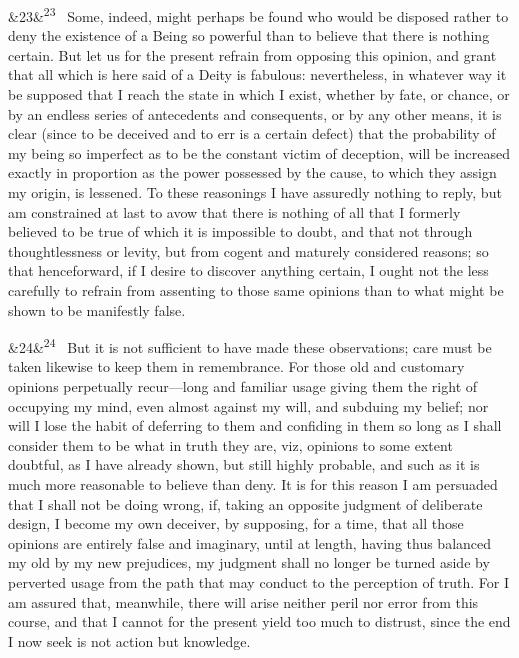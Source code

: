 \documentclass[12pt]{article}
\newcommand{\para}[1][]{\par\noindent\ifx&#1&\else\textsuperscript{\footnotesize #1}~\fi}
\begin{document}
\para[23] Some, indeed, might perhaps be found who would be disposed rather to deny the existence of a Being so powerful than to believe that there is nothing certain. But let us for the present refrain from opposing this opinion, and grant that all which is here said of a Deity is fabulous: nevertheless, in whatever way it be supposed that I reach the state in which I exist, whether by fate, or chance, or by an endless series of antecedents and consequents, or by any other means, it is clear (since to be deceived and to err is a certain defect) that the probability of my being so imperfect as to be the constant victim of deception, will be increased exactly in proportion as the power possessed by the cause, to which they assign my origin, is lessened. To these reasonings I have assuredly nothing to reply, but am constrained at last to avow that there is nothing of all that I formerly believed to be true of which it is impossible to doubt, and that not through thoughtlessness or levity, but from cogent and maturely considered reasons; so that henceforward, if I desire to discover anything certain, I ought not the less carefully to refrain from assenting to those same opinions than to what might be shown to be manifestly false.

\para[24] But it is not sufficient to have made these observations; care must be taken likewise to keep them in remembrance. For those old and customary opinions perpetually recur---long and familiar usage giving them the right of occupying my mind, even almost against my will, and subduing my belief; nor will I lose the habit of deferring to them and confiding in them so long as I shall consider them to be what in truth they are, viz, opinions to some extent doubtful, as I have already shown, but still highly probable, and such as it is much more reasonable to believe than deny. It is for this reason I am persuaded that I shall not be doing wrong, if, taking an opposite judgment of deliberate design, I become my own deceiver, by supposing, for a time, that all those opinions are entirely false and imaginary, until at length, having thus balanced my old by my new prejudices, my judgment shall no longer be turned aside by perverted usage from the path that may conduct to the perception of truth. For I am assured that, meanwhile, there will arise neither peril nor error from this course, and that I cannot for the present yield too much to distrust, since the end I now seek is not action but knowledge.
\end{document}
